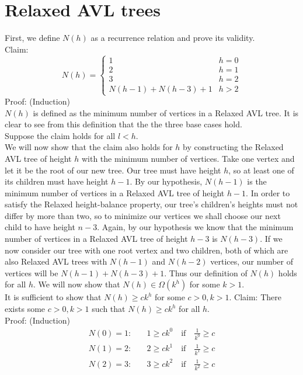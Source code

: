 \documentclass{article}
\begin{document}
\section{Relaxed AVL trees}
	First, we define $N(h)$ as a recurrence relation and prove its validity.\\
	Claim: \[N(h) =
				\begin{cases}
					1 & h=0\\
					2 & h=1\\
					3 & h=2\\
					N(h-1)+N(h-3)+1 & h > 2
				\end{cases}
			\]
	Proof: (Induction)\\
	$N(h)$ is defined as the minimum number of vertices in a Relaxed AVL tree. It is clear to see
	from this definition that the the three base cases hold.\\
	Suppose the claim holds for all $l<h$.\\
	We will now show that the claim also holds for $h$ by constructing the Relaxed AVL tree of height $h$ with the minimum number of vertices.
	Take one vertex and let it be the root of our new tree. Our tree must have height $h$, so at least one of its children must have height $h-1$.
	By our hypothesis, $N(h-1)$ is the minimum number of vertices in a Relaxed AVL tree of height $h-1$. In order to satisfy the Relaxed height-balance
	property, our tree's children's heights must not differ by more than two, so to minimize our vertices we shall choose our next child to have height $n-3$.
	Again, by our hypothesis we know that the minimum number of vertices in a Relaxed AVL tree of height $h-3$ is $N(h-3)$. If we now consider our tree
	with one root vertex and two children, both of which are also Relaxed AVL trees with $N(h-1)$ and $N(h-2)$ vertices, our number of vertices will be
	$N(h-1)+N(h-3)+1$. Thus our definition of $N(h)$ holds for all $h$.
	\newline
	\newline
	We will now show that $N(h)\in{\Omega{(k^h)}}$ for some $k>1$.\\
	It is sufficient to show that $N(h)\ge{ck^h}$ for some $c>0,k>1$.
	Claim: There exists some $c>0,k>1$ such that $N(h)\ge{ck^h}$ for all $h$.\\
	Proof: (Induction)
	\begin{align*}
		N(0)=1: \quad& 1\ge{ck^0}\quad\text{if}\quad\frac{1}{k^0}\ge{c}\\[1em]
		N(1)=2: \quad& 2\ge{ck^1}\quad\text{if}\quad\frac{1}{k^1}\ge{c}\\[1em]
		N(2)=3: \quad& 3\ge{ck^2}\quad\text{if}\quad\frac{1}{k^2}\ge{c}
	\end{align*}
\end{document}
